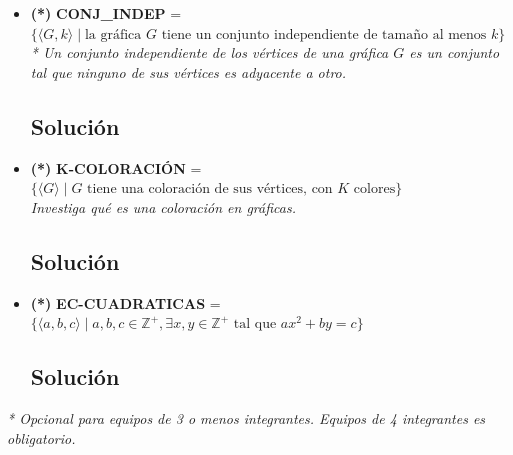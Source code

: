 \begin{itemize}[leftmargin=*]
    Al ser un lenguaje perteneciente a la clase determinista $\mathbf{P}$:

    Como $\mathbf{P} \subseteq \mathbf{NP}$, el algoritmo determinista $M$ actúa como un verificador que ignora cualquier certificado, manteniendo la complejidad de tiempo $O(|V| + |E|)$.

    Por otro lado, como la clase $\mathbf{P}$ es cerrada bajo complemento ($\mathbf{P} = \text{co}\mathbf{P}$), el complemento $\overline{\text{CONECTIVIDAD}}$ (las gráficas desconexas) también pertenece a $\mathbf{P}$, concluyendo que \textbf{$\text{CONECTIVIDAD} \in \mathbf{coNP}$}.

    \vspace{0.5cm}
    \item \textbf{(*)} \textbf{CONJ\_INDEP} = $\{ \langle G, k \rangle \mid \text{la gráfica } G \text{ tiene un conjunto independiente de tamaño al menos } k \}$ \\
    \textit{* Un conjunto independiente de los vértices de una gráfica $G$ es un conjunto tal que ninguno de sus vértices es adyacente a otro.}
    
    \subsection*{Solución}

    \vspace{0.5cm}
    \item \textbf{(*)} \textbf{K-COLORACIÓN} = $\{ \langle G \rangle \mid G \text{ tiene una coloración de sus vértices, con } K \text{ colores} \}$ \\
    \textit{Investiga qué es una coloración en gráficas.}
    
    \subsection*{Solución}

    \vspace{0.5cm}
    \item \textbf{(*)} \textbf{EC-CUADRATICAS} = $\{ \langle a, b, c \rangle \mid a, b, c \in \mathbb{Z}^+, \exists x, y \in \mathbb{Z}^+ \text{ tal que } ax^2 + by = c \}$
    
    \subsection*{Solución}

\end{itemize}

\vspace{0.5cm}
\textit{* Opcional para equipos de 3 o menos integrantes. Equipos de 4 integrantes es obligatorio.}